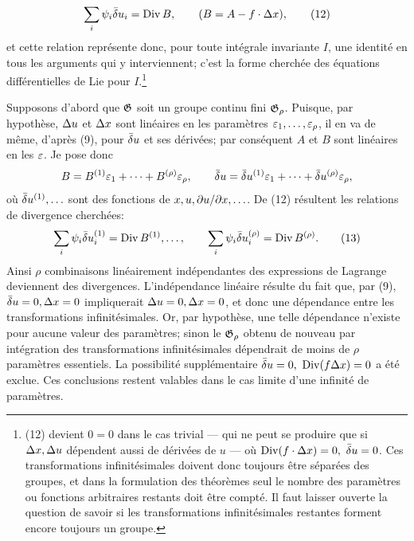 \begin{equation}
\sum_i\psi_i\bar{\delta} u_i=\operatorname{Div} B,\qquad (B=A-f\cdot\Delta x),
\tag{12}
\end{equation}
et cette relation représente donc, pour toute intégrale invariante \(I\), une identité en tous les arguments qui y interviennent; c'est la forme cherchée des équations différentielles de Lie pour \(I\).\footnote{(12) devient \(0=0\) dans le cas trivial --- qui ne peut se produire que si \(\Delta x,\Delta u\) dépendent aussi de dérivées de \(u\) --- où \(\operatorname{Div}(f\cdot\Delta x)=0,\ \bar{\delta} u=0\). Ces transformations infinitésimales doivent donc toujours être séparées des groupes, et dans la formulation des théorèmes seul le nombre des paramètres ou fonctions arbitraires restants doit être compté. Il faut laisser ouverte la question de savoir si les transformations infinitésimales restantes forment encore toujours un groupe.}

Supposons d'abord que \(\mathfrak G\) soit un groupe continu fini \(\mathfrak G_\rho\). Puisque, par hypothèse, \(\Delta u\) et \(\Delta x\) sont linéaires en les paramètres \(\varepsilon_1,\ldots,\varepsilon_\rho\), il en va de même, d'après (9), pour \(\bar{\delta} u\) et ses dérivées; par conséquent \(A\) et \(B\) sont linéaires en les \(\varepsilon\). Je pose donc
\[
B=B^{(1)}\varepsilon_1+\cdots+B^{(\rho)}\varepsilon_\rho,\qquad
\bar{\delta} u=\bar{\delta} u^{(1)}\varepsilon_1+\cdots+\bar{\delta} u^{(\rho)}\varepsilon_\rho,
\]
où \(\bar{\delta} u^{(1)},\ldots\) sont des fonctions de \(x,u,\partial u/\partial x,\ldots\). De (12) résultent les relations de divergence cherchées:
\begin{equation}
\sum_i\psi_i\bar{\delta} u_i^{(1)}=\operatorname{Div} B^{(1)},\ldots,\qquad
\sum_i\psi_i\bar{\delta} u_i^{(\rho)}=\operatorname{Div} B^{(\rho)}.
\tag{13}
\end{equation}
Ainsi \(\rho\) combinaisons linéairement indépendantes des expressions de Lagrange deviennent des divergences. L'indépendance linéaire résulte du fait que, par (9), \(\bar{\delta} u=0,\Delta x=0\) impliquerait \(\Delta u=0,\Delta x=0\), et donc une dépendance entre les transformations infinitésimales. Or, par hypothèse, une telle dépendance n'existe pour aucune valeur des paramètres; sinon le \(\mathfrak G_\rho\) obtenu de nouveau par intégration des transformations infinitésimales dépendrait de moins de \(\rho\) paramètres essentiels. La possibilité supplémentaire \(\bar{\delta} u=0,\ \operatorname{Div}(f\Delta x)=0\) a été exclue. Ces conclusions restent valables dans le cas limite d'une infinité de paramètres.

